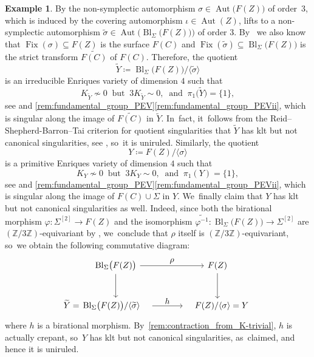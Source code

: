 \documentclass[JEP,XML,SOM,Unicode,published]{cedram}
\let\ts\textstyle
\theoremstyle{plain}
\theoremstyle{definition}
\newtheorem{exa}[thm]{Example}
\newcommand{\Z}{\mathbb{Z}}
\DeclareMathOperator{\Aut}{Aut}
\DeclareMathOperator{\Fix}{Fix}
\DeclareMathOperator{\Bl}{Bl}
\begin{document}
\begin{exa}
By \cite[Th.\,4.1(4)]{BHS25} the non-symplectic automorphism $\sigma \in \Aut\bigl(F(Z)\bigr)$ of order~$3$, which is induced by the covering automorphism $\iota \in \Aut(Z)$, lifts to a non-symplectic automorphism $\widetilde{\sigma} \in \Aut \bigl(\Bl_\Sigma \bigl(F(Z) \bigr) \bigr)$ of order $3$. By~\cite[Rem.\,4.3]{BHS25} we also know that $\Fix(\sigma) \subseteq F(Z)$ is the surface $F(C)$ and $\Fix(\widetilde{\sigma}) \subseteq \Bl_\Sigma \bigl(F(Z) \bigr)$ is the strict transform $\widetilde{F(C)}$ of $F(C)$.
Therefore, the quotient
\[
\widetilde{Y} \coloneqq \Bl_\Sigma \bigl(F(Z)\bigr) / \langle \widetilde{\sigma} \rangle
\]
is an irreducible Enriques variety of dimension $4$ such that
\[
K_{\widetilde{Y}} \nsim 0 \ \text{ but } \ 3K_{\widetilde{Y}} \sim 0, \ \text{ and } \ \pi_1 \bigl(\widetilde{Y} \bigr) = \{ 1 \},
\]
see \cite[Prop.\,5.4]{BCS24} and \autoref{rem:fundamental_group_PEV}\eqref{rem:fundamental_group_PEVii},
which is singular along the image of $\widetilde{F(C)}$ in $\widetilde{Y}$. In~fact, it~follows from the Reid--Shepherd-Barron--Tai criterion for quotient singularities that $\widetilde{Y}$ has klt but not canonical singularities, see \cite[\S 6.2.1]{BCS24}, so~it is uniruled. Similarly, the quotient
\[
Y \coloneqq F(Z) / \langle \sigma \rangle
\]
is a primitive Enriques variety of dimension $4$ such that
\[
K_Y \nsim 0 \ \text{ but } \ 3K_Y \sim 0, \ \text{ and } \ \pi_1 (Y) = \{ 1 \},
\]
see \cite[Prop.\,5.4]{BCS24} and \autoref{rem:fundamental_group_PEV}\eqref{rem:fundamental_group_PEVii},
which is singular along the image of $F(C) \cup \Sigma$ in $Y$. We~finally claim that $Y$ has klt but not canonical singularities as well.
Indeed, since both the birational morphism $\varphi \colon \Sigma^{[2]} \to F(Z)$ and the isomorphism $\widetilde{\varphi^{-1}} \colon \Bl_\Sigma \bigl(F(Z)\bigr) \to \Sigma^{[2]}$ are $(\Z / 3\Z)$-equivariant by \cite[Th.\,4.1(1)(4)]{BHS25}, we~conclude that $\rho$ itself is $(\Z / 3\Z)$-equivariant, so~we obtain the following commutative diagram:
\begin{equation}
\label{diagram:PEVs_from_BHS25}
\begin{tikzcd}[row sep = large, column sep = large, /tikz/column 1/.append style={column sep = 0pt, inner xsep = 0pt}]
& \Bl_\Sigma \bigl(F(Z)\bigr) \arrow[r, "\ts \rho"] \arrow[d] & F(Z) \arrow[d] \\
\widetilde{Y} = & \Bl_\Sigma \bigl(F(Z)\bigr) / \langle \widetilde{\sigma} \rangle \arrow[r, "\ts h"] \hspace{1em} & \hspace{1em} F(Z) / \langle \sigma \rangle = Y
\end{tikzcd}
\end{equation}
where $h$ is a birational morphism. By~\autoref{rem:contraction_from_K-trivial}, $h$ is actually crepant, so~$Y$ has klt but not canonical singularities, as~claimed, and hence it is uniruled.


\end{exa}
\end{document}
